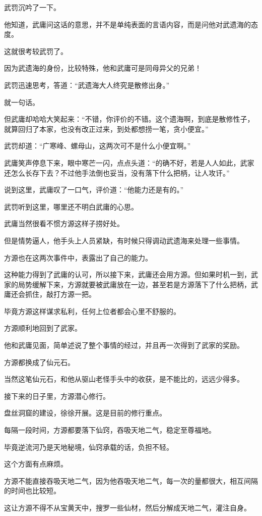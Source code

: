 \begin{this_body}
武罚沉吟了一下。

他知道，武庸问这话的意思，并不是单纯表面的言语内容，而是问他对武遗海的态度。

这就很考较武罚了。

因为武遗海的身份，比较特殊，他和武庸可是同母异父的兄弟！

武罚迅速思考，答道：“武遗海大人终究是散修出身。”

就一句话。

但武庸却哈哈大笑起来：“不错，你评价的不错。这个遗海啊，到底是散修性子，就算回归了本家，也没有改正过来，到处都想捞一笔，贪小便宜。”

武罚却道：“广寒峰、螺母山，这两次可不是什么小便宜啊。”

武庸笑声停息下来，眼中寒芒一闪，点点头道：“的确不好，若是人人如此，武家还怎么长存下去？不过他手法倒也妥当，没有落下什么把柄，让人攻讦。”

说到这里，武庸叹了一口气，评价道：“他能力还是有的。”

武罚听到这里，哪里还不明白武庸的心思。

武庸当然很看不惯方源这样子捞好处。

但是情势逼人，他手头上人员紧缺，有时候只得调动武遗海来处理一些事情。

方源也在这两次事件中，表露出了自己的能力。

这种能力得到了武庸的认可，所以接下来，武庸还会用方源。但如果时机一到，武家的局势缓解下来，方源就要被武庸放在一边，甚至若是方源落下了什么把柄，武庸还会抓住，敲打方源一把。

毕竟方源这样谋求私利，任何上位者都会心里不舒服的。

方源顺利地回到了武家。

他和武庸见面，简单述说了整个事情的经过，并且再一次得到了武家的奖励。

方源都换成了仙元石。

当然这笔仙元石，和他从驱山老怪手头中的收获，是不能比的，远远少得多。

接下来的日子里，方源潜心修行。

盘丝洞窟的建设，徐徐开展。这是目前的修行重点。

每隔一段时间，方源都要落下仙窍，吞吸天地二气，稳定至尊福地。

毕竟逆流河乃是天地秘境，仙窍承载的话，负担不轻。

这个方面有点麻烦。

方源不能直接吞吸天地二气，因为他吞吸天地二气，每一次的量都很大，相互间隔的时间也比较短。

这让方源不得不从宝黄天中，搜罗一些仙材，然后分解成天地二气，灌注自身。


\end{this_body}
